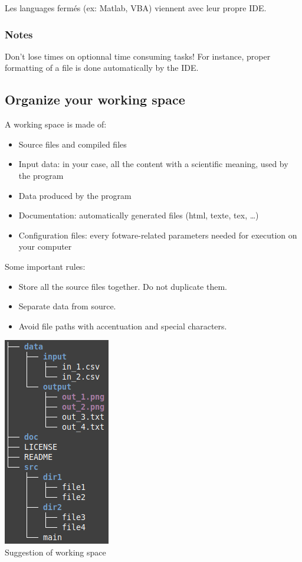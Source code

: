 \documentclass[11pt]{article}
\begin{document}
				Les languages fermés (ex: Matlab, VBA) viennent avec leur propre IDE.

			\subsubsection{Notes}
				Don't lose times on optionnal time consuming tasks! For instance, proper formatting of a file is done automatically by the IDE.

		\subsection{Organize your working space}
			\begin{minipage}{.65\textwidth}
				A working space is made of:
				\begin{itemize}
					\item Source files and compiled files
					\item Input data: in your case, all the content with a scientific meaning, used by the program
					\item Data produced by the program
					\item Documentation: automatically generated files (html, texte, tex, \ldots)
					\item Configuration files: every fotware-related parameters needed for execution on your computer
				\end{itemize}
				Some important rules:
				\begin{itemize}
					\item Store all the source files together. Do not duplicate them.
					\item Separate data from source.
					\item Avoid file paths with accentuation and special characters.
				\end{itemize}
			\end{minipage}
			\begin{minipage}{.3\textwidth}
				\centering
				\includegraphics[width=4 cm]{figures/tree}
				\\
				Suggestion of working space
			\end{minipage}
\end{document}
